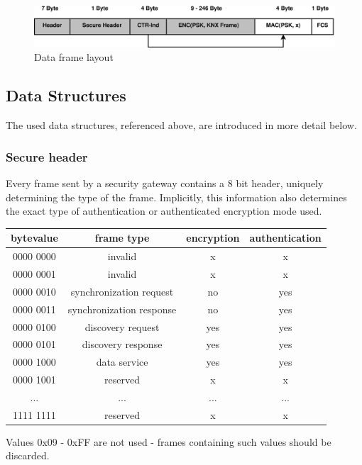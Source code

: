 \begin{figure}
  \centering
    \includegraphics[width=1\textwidth]{figures/formatData.eps}
 \caption{Data  frame layout}
 \label{fig:dataFormat}
\end{figure}

\subsection{Data Structures}

The used data structures, referenced above, are introduced in more detail below.

\subsubsection{Secure header}\label{secHdr}
Every frame sent by a security gateway contains a 8 bit header, uniquely determining the type of the frame. Implicitly, this information also determines
the exact type of authentication or authenticated encryption mode used.

\begin{center}
\begin{tabular}{ c | c | c | c}
 \label{table:secHeader}
   bytevalue & frame type & encryption & authentication \\ \hline
   0000 0000 & invalid & x & x \\
   0000 0001 & invalid & x & x \\
   0000 0010 & synchronization request & no & yes \\
   0000 0011 & synchronization response & no & yes \\
   0000 0100 & discovery request & yes & yes \\
   0000 0101 & discovery response & yes & yes \\
   0000 1000 & data service & yes & yes \\
   0000 1001 & reserved & x & x \\
   ...  & ...  & ... & ... \\
   1111 1111 & reserved & x & x \\
\end{tabular}
\end{center}
Values 0x09 - 0xFF are not used - frames containing such values should be discarded.


